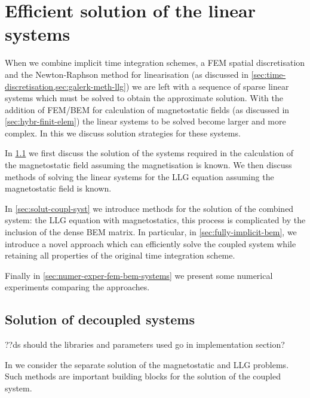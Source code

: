 \chapter{Efficient solution of the linear systems}
\label{sec:solution-strategies}

\newcommand{\Nn}{N} %
\newcommand{\Nb}{N_b} %
\newcommand{\Nj}{N_j} %

When we combine implicit time integration schemes, a FEM spatial discretisation and the Newton-Raphson method for linearisation (as discussed in \cref{sec:time-discretisation,sec:galerk-meth-llg}) we are left with a sequence of sparse linear systems which must be solved to obtain the approximate solution.
With the addition of FEM/BEM for calculation of magnetostatic fields (as discussed in \cref{sec:hybr-finit-elem}) the linear systems to be solved become larger and more complex.
In this  we discuss solution strategies for these systems.

In \cref{sec:llg-only-system} we first discuss the solution of the systems required in the calculation of the magnetostatic field assuming the magnetisation is known.
We then discuss methods of solving the linear systems for the LLG equation assuming the magnetostatic field is known.

In \cref{sec:solut-coupl-syst} we introduce methods for the solution of the combined system: the LLG equation with magnetostatics, this process is complicated by the inclusion of the dense BEM matrix.
In particular, in \cref{sec:fully-implicit-bem}, we introduce a novel approach which can efficiently solve the coupled system while retaining all properties of the original time integration scheme.

Finally in \cref{sec:numer-exper-fem-bem-systems} we present some numerical experiments comparing the approaches.


\section{Solution of decoupled systems}
\label{sec:llg-only-system}

??ds should the libraries and parameters used go in implementation section?

In  we consider the separate solution of the magnetostatic and LLG problems.
Such methods are important building blocks for the solution of the coupled system.

